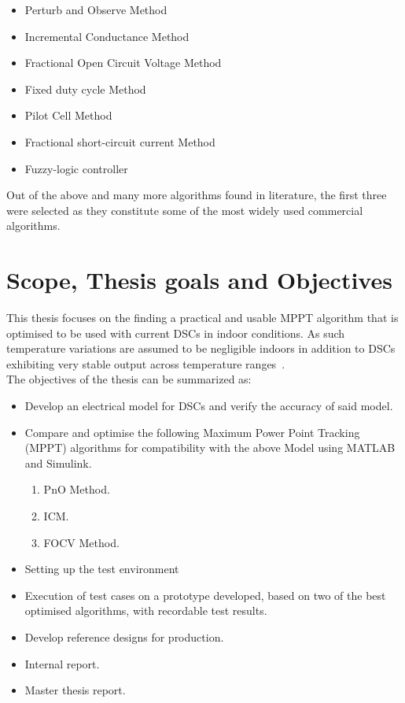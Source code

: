  
\begin{itemize}
 \item Perturb and Observe Method
 \item Incremental Conductance Method
 \item Fractional Open Circuit Voltage Method
 \item Fixed duty cycle Method
 \item Pilot Cell Method
 \item Fractional short-circuit current Method
 \item Fuzzy-logic controller
\end {itemize}
 
Out of the above and many more algorithms found in literature, the first three were selected as they constitute some of the most widely used commercial algorithms.
 
 \section{Scope, Thesis goals and Objectives}

This thesis focuses on the finding a practical and usable \ac{MPPT} algorithm that is optimised to be used with current \ac{DSCs} in indoor conditions. As such temperature variations are assumed to be negligible indoors in addition to \ac{DSCs} exhibiting very stable output across temperature ranges~\cite{lee2010high}.\\


The objectives of the thesis can be summarized as:
\begin{itemize}

\item Develop an electrical model for DSCs and verify the accuracy of said model.
 
\item Compare and optimise the following Maximum Power Point Tracking (MPPT) algorithms for compatibility with the above Model using MATLAB{\textregistered} and Simulink{\textregistered}.
	\begin{enumerate}
		\item \ac{PnO} Method.
		\item \ac{ICM}.
		\item \ac{FOCV} Method.
		
	\end{enumerate}
\item Setting up the test environment   
\item Execution of test cases on a prototype developed, based on two of the best optimised algorithms, with recordable test results.
\item Develop reference designs for production.
\item Internal report.
\item  Master thesis report. 
\end {itemize}

